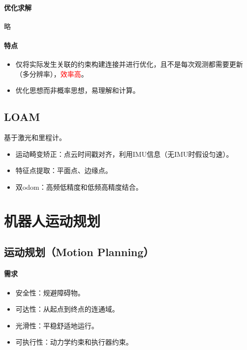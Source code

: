 \documentclass[
12pt, %
a4paper, 
oneside, %
]{scrartcl}
\begin{document}
\paragraph{优化求解}
略
\paragraph{特点}
\begin{itemize}
\item 仅将实际发生关联的约束构建连接并进行优化，且不是每次观测都需要更新（多分辨率），\textcolor{red}{效率高}。
\item 优化思想而非概率思想，易理解和计算。
\end{itemize}
\subsection[LOAM]{LOAM}
基于激光和里程计。
\begin{itemize}
\item 运动畸变矫正：点云时间戳对齐，利用IMU信息（无IMU时假设匀速）。
\item 特征点提取：平面点、边缘点。
\item 双odom：高频低精度和低频高精度结合。
\end{itemize}
\section{机器人运动规划}
\subsection[运动规划]{运动规划（Motion Planning）}
\paragraph{需求}
\begin{itemize}
\item 安全性：规避障碍物。
\item 可达性：从起点到终点的连通域。
\item 光滑性：平稳舒适地运行。
\item 可执行性：动力学约束和执行器约束。
\end{itemize}
\end{document}
